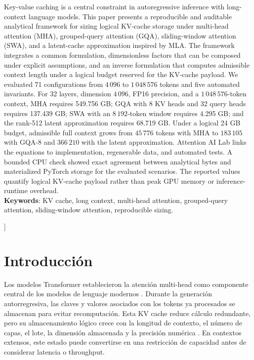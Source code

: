 \documentclass[a4paper,twocolumn]{article}
\begin{document}
\begin{onecolabstract}
Key-value caching is a central constraint in autoregressive inference with long-context language models. This paper presents a reproducible and auditable analytical framework for sizing logical KV-cache storage under multi-head attention (MHA), grouped-query attention (GQA), sliding-window attention (SWA), and a latent-cache approximation inspired by MLA. The framework integrates a common formulation, dimensionless factors that can be composed under explicit assumptions, and an inverse formulation that computes admissible context length under a logical budget reserved for the KV-cache payload. We evaluated 71 configurations from $4\,096$ to $1\,048\,576$ tokens and five automated invariants. For 32 layers, dimension $4\,096$, FP16 precision, and a $1\,048\,576$-token context, MHA requires 549.756 GB; GQA with 8 KV heads and 32 query heads requires 137.439 GB; SWA with an $8\,192$-token window requires 4.295 GB; and the rank-512 latent approximation requires 68.719 GB. Under a logical 24 GB budget, admissible full context grows from $45\,776$ tokens with MHA to $183\,105$ with GQA-8 and $366\,210$ with the latent approximation. Attention AI Lab links the equations to implementation, regenerable data, and automated tests. A bounded CPU check showed exact agreement between analytical bytes and materialized PyTorch storage for the evaluated scenarios. The reported values quantify logical KV-cache payload rather than peak GPU memory or inference-runtime overhead.\\

\noindent\textbf{Keywords}: KV cache, long context, multi-head attention, grouped-query attention, sliding-window attention, reproducible sizing.
\vspace{3ex}
\end{onecolabstract}
]

\section{Introducción}
Los modelos Transformer establecieron la atención multi-head como componente central de los modelos de lenguaje modernos \cite{vaswani2017attention}. Durante la generación autorregresiva, las claves y valores asociados con los tokens ya procesados se almacenan para evitar recomputación. Esta KV cache reduce cálculo redundante, pero su almacenamiento lógico crece con la longitud de contexto, el número de capas, el lote, la dimensión almacenada y la precisión numérica \cite{shazeer2019fast,pope2022efficiently}. En contextos extensos, este estado puede convertirse en una restricción de capacidad antes de considerar latencia o throughput.
\end{document}
